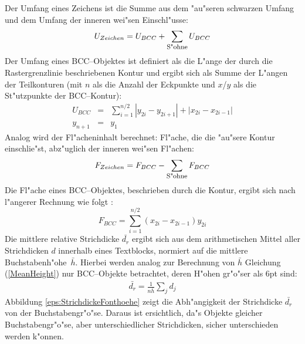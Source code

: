 \begin{enumerate}
  Der Umfang eines Zeichens ist die Summe aus dem "au"seren schwarzen Umfang und dem Umfang
  der inneren wei"sen Einschl"usse:
  $$U_{Zeichen} = U_{BCC} + \sum_{\mbox{\footnotesize S"ohne}} U_{BCC}$$
  Der Umfang eines BCC--Objektes ist definiert als die L"ange der durch die Rastergrenzlinie beschriebenen Kontur und ergibt sich als Summe der L"angen der Teilkonturen
  (mit $n$ als die Anzahl der Eckpunkte und $x$/$y$ als die St"utzpunkte der BCC--Kontur):
  \begin{eqnarray*}
    U_{BCC} &=& \sum^{n/2}_{i=1} \left|y_{2i} - y_{2i+1} \right| + \left|x_{2i} - x_{2i-1} \right|\\[2mm]
    y_{n+1} &=& y_1
  \end{eqnarray*}
  Analog wird der Fl"acheninhalt berechnet: Fl"ache, die die "au"sere Kontur einschlie"st, abz"uglich
  der inneren wei"sen Fl"achen:
  $$F_{Zeichen} = F_{BCC} - \sum_{\mbox{\footnotesize S"ohne}} F_{BCC}$$
  Die Fl"ache eines BCC--Objektes, beschrieben durch die Kontur, ergibt sich nach l"angerer
  Rechnung wie folgt \cite{Bartneck87}:
  $$F_{BCC} = \sum^{n/2}_{i=1} \left(x_{2i} - x_{2i-1} \right) y_{2i}$$
  Die mittlere relative Strichdicke $\bar{d_r}$ ergibt sich aus dem arithmetischen Mittel aller
  Strichdicken $d$ innerhalb eines Textblocks, normiert auf die mittlere Buchstabenh"ohe~$\bar{h}$.
  Hierbei werden analog zur Berechnung von $\bar{h}$ Gleichung (\ref{MeanHeight}) nur BCC--Objekte
  betrachtet, deren H"ohen gr"o"ser als 6pt sind:
  \begin{eqnarray}
    \bar{d_r} = \frac{1}{n \bar{h}} \sum_{j} d_j
  \end{eqnarray}
  Abbildung \ref{eps:StrichdickeFonthoehe} zeigt die Abh"angigkeit der Strichdicke $\bar{d_r}$
  von der Buchstabengr"o"se. Da\-raus ist ersichtlich, da"s Objekte gleicher Buchstabengr"o"se, aber
  unterschiedlicher Strichdicken, sicher unterschieden werden k"onnen.
\end{enumerate}

